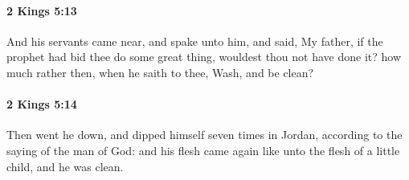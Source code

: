 		\paragraph{2 Kings 5:13} %
			\label{2KINGS-5-13}

			And his servants came near, and spake unto him, and said, My father, if the prophet had bid thee do some great thing, wouldest thou not have done it? how much rather then, when he saith to thee, Wash, and be clean?


		\paragraph{2 Kings 5:14} %
			\label{2KINGS-5-14}

			Then went he down, and dipped himself seven times in Jordan, according to the saying of the man of God: and his flesh came again like unto the flesh of a little child, and he was clean.

